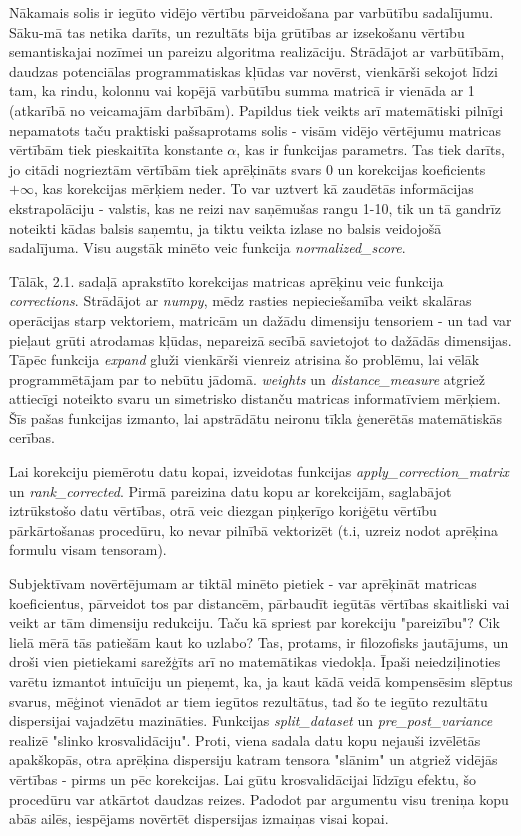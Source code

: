 \documentclass[12pt, a4paper]{article}
\begin{document}
Nākamais solis ir iegūto vidējo vērtību pārveidošana par varbūtību sadalījumu. Sāku-mā tas netika darīts, un rezultāts bija grūtības ar izsekošanu vērtību semantiskajai nozīmei un pareizu algoritma realizāciju. Strādājot ar varbūtībām, daudzas potenciālas programmatiskas kļūdas var novērst, vienkārši sekojot līdzi tam, ka rindu, kolonnu vai kopējā varbūtību summa matricā ir vienāda ar 1 (atkarībā no veicamajām darbībām). Papildus tiek veikts arī matemātiski pilnīgi nepamatots taču praktiski pašsaprotams solis - visām vidējo vērtējumu matricas vērtībām tiek pieskaitīta konstante $\alpha$, kas ir funkcijas parametrs. Tas tiek darīts, jo citādi nogrieztām vērtībām tiek aprēķināts svars 0 un korekcijas koeficients $+\infty$, kas korekcijas mērķiem neder. To var uztvert kā zaudētās informācijas ekstrapolāciju - valstis, kas ne reizi nav saņēmušas rangu 1-10, tik un tā gandrīz noteikti kādas balsis saņemtu, ja tiktu veikta izlase no balsis veidojošā sadalījuma. Visu augstāk minēto veic funkcija \textit{normalized\_score}.

Tālāk, 2.1. sadaļā aprakstīto korekcijas matricas aprēķinu veic funkcija \textit{corrections}. Strādājot ar \textit{numpy}, mēdz rasties nepieciešamība veikt skalāras operācijas starp vektoriem, matricām un dažādu dimensiju tensoriem - un tad var pieļaut grūti atrodamas kļūdas, nepareizā secībā savietojot to dažādās dimensijas. Tāpēc funkcija \textit{expand} gluži vienkārši vienreiz atrisina šo problēmu, lai vēlāk programmētājam par to nebūtu jādomā. \textit{weights} un \textit{distance\_measure} atgriež attiecīgi noteikto svaru un simetrisko distanču matricas informatīviem mērķiem. Šīs pašas funkcijas izmanto, lai apstrādātu neironu tīkla ģenerētās matemātiskās cerības.

Lai korekciju piemērotu datu kopai, izveidotas funkcijas \textit{apply\_correction\_matrix} un \textit{rank\_corrected}. Pirmā pareizina datu kopu ar korekcijām, saglabājot iztrūkstošo datu vērtības, otrā veic diezgan piņķerīgo koriģētu vērtību pārkārtošanas procedūru, ko nevar pilnībā vektorizēt (t.i, uzreiz nodot aprēķina formulu visam tensoram).

Subjektīvam novērtējumam ar tiktāl minēto pietiek - var aprēķināt matricas koeficientus, pārveidot tos par distancēm, pārbaudīt iegūtās vērtības skaitliski vai veikt ar tām dimensiju redukciju. Taču kā spriest par korekciju "pareizību"? Cik lielā mērā tās patiešām kaut ko uzlabo? Tas, protams, ir filozofisks jautājums, un droši vien pietiekami sarežģīts arī no matemātikas viedokļa. Īpaši neiedziļinoties varētu izmantot intuīciju un pieņemt, ka, ja kaut kādā veidā kompensēsim slēptus svarus, mēģinot vienādot ar tiem iegūtos rezultātus, tad šo te iegūto rezultātu dispersijai vajadzētu mazināties. Funkcijas \textit{split\_dataset} un \textit{pre\_post\_variance} realizē "slinko krosvalidāciju". Proti, viena sadala datu kopu nejauši izvēlētās apakškopās, otra aprēķina dispersiju katram tensora "slānim" un atgriež vidējās vērtības - pirms un pēc korekcijas. Lai gūtu krosvalidācijai līdzīgu efektu, šo procedūru var atkārtot daudzas reizes. Padodot par argumentu visu treniņa kopu abās ailēs, iespējams novērtēt dispersijas izmaiņas visai kopai.
\end{document}
